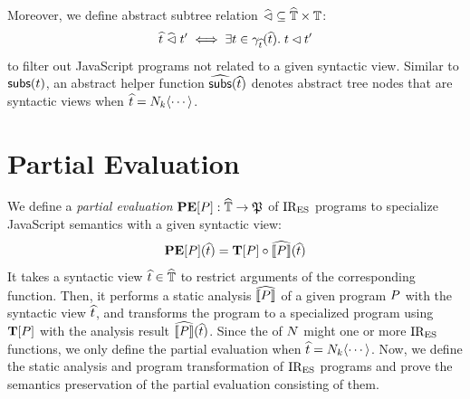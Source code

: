 \documentclass[10pt,conference]{IEEEtran}
\begin{document}
% 
% 
% 
Moreover, we define abstract subtree relation $\widehat{\lhd} \subseteq \widehat{\mathbb{T}}
\times \mathbb{T}$:
\[
  \widehat{t} \; \widehat{\lhd} \; t' \iff \exists t \in \gamma_{\widehat{t}}(\widehat{t}). \;
  t \lhd t'
\]
to filter out JavaScript programs not related to a given syntactic view.
Similar to $\getsubs(\tree)$, an abstract helper function $\agetsubs(\atree)$
denotes abstract tree nodes that are syntactic views when $\widehat{t} = N_k
\langle \cdots \rangle$.



\section{Partial Evaluation}

We define a \textit{partial evaluation} $\textbf{PE}[P]: \widehat{\mathbb{T}} \rightarrow
\mathfrak{P}$ of $\text{IR}_\text{ES}$ programs to specialize JavaScript semantics with a given
syntactic view:
\[
  \textbf{PE}[P](\widehat{t}) = \textbf{T}[P] \circ \widehat{\llbracket{P}\rrbracket} (\widehat{t})
\]
It takes a syntactic view $\widehat{t} \in \widehat{\mathbb{T}}$ to restrict arguments of the
corresponding  function. Then, it performs a static analysis
$\widehat{\llbracket{P}\rrbracket}$ of a given program $P$ with the syntactic view $\widehat{t}$, and
transforms the program to a specialized program using $\textbf{T}[P]$ with
the analysis result $\widehat{\llbracket{P}\rrbracket}(\widehat{t})$.  Since the  of
$N$ might one or more $\text{IR}_\text{ES}$ functions, we only define the partial evaluation
when $\widehat{t} = N_k \langle \cdots \rangle$.  Now, we define the static
analysis and program transformation of $\text{IR}_\text{ES}$ programs and prove the semantics
preservation of the partial evaluation consisting of them.
\end{document}
